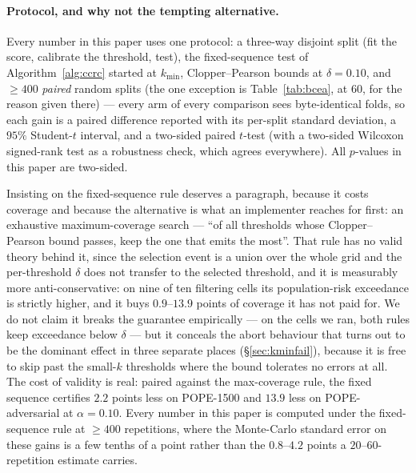 \documentclass[review,number,doubleblind]{elsarticle}
\theoremstyle{plain}
\theoremstyle{definition}
\theoremstyle{remark}
\begin{document}
\paragraph{Protocol, and why not the tempting alternative.}
Every number in this paper uses one protocol: a three-way disjoint split (fit the score,
calibrate the threshold, test), the fixed-sequence test of Algorithm~\ref{alg:ccrc} started at
$k_{\min}$, Clopper--Pearson bounds at $\delta=0.10$, and $\ge400$ \emph{paired} random splits
(the one exception is Table~\ref{tab:bcea}, at $60$, for the reason given there)
--- every arm of every comparison sees byte-identical folds, so each gain is a paired difference
reported with its per-split standard deviation, a $95\%$ Student-$t$ interval, and a two-sided
paired $t$-test (with a two-sided Wilcoxon signed-rank test as a robustness check, which agrees
everywhere). All $p$-values in this paper are two-sided.

Insisting on the fixed-sequence rule deserves a paragraph, because it costs coverage and
because the alternative is what an implementer reaches for first: an exhaustive
maximum-coverage search --- ``of all thresholds whose Clopper--Pearson bound passes, keep the
one that emits the most''. That rule has no valid theory behind it, since the selection event
is a union over the whole grid and the per-threshold $\delta$ does not transfer to the selected
threshold, and it is measurably more anti-conservative: on nine of ten filtering cells its
population-risk exceedance is strictly higher, and it buys $0.9$--$13.9$ points of coverage it
has not paid for. We do not claim it breaks the guarantee empirically --- on the cells we ran,
both rules keep exceedance below $\delta$ --- but it conceals the abort behaviour that turns out
to be the dominant effect in three separate places (\S\ref{sec:kminfail}), because it is free to
skip past the small-$k$ thresholds where the bound tolerates no errors at all. The cost of
validity is real: paired against the max-coverage rule, the fixed sequence certifies $2.2$
points less on POPE-1500 and $13.9$ less on POPE-adversarial at $\alpha=0.10$. Every number in
this paper is computed under the fixed-sequence rule at $\ge400$ repetitions, where the
Monte-Carlo standard error on these gains is a few tenths of a point rather than the
$0.8$--$4.2$ points a $20$--$60$-repetition estimate carries.
\end{document}
